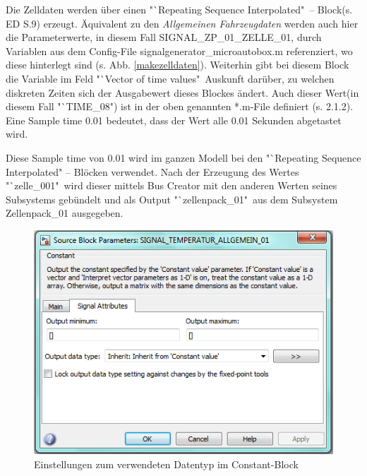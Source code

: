 \documentclass[fontsize = 12pt, paper = a4]{scrreprt}
\begin{document}
Die Zelldaten werden über einen "`Repeating Sequence Interpolated"\ -- Block(s. ED S.9) erzeugt. Äquivalent zu den \textit{Allgemeinen Fahrzeugdaten} werden auch hier die Parameterwerte, in diesem Fall SIGNAL\_ZP\_01\_ZELLE\_01, durch Variablen aus dem Config-File signalgenerator\_microautobox.m referenziert, wo diese hinterlegt sind (s. Abb. \ref{makezelldaten}). Weiterhin gibt bei diesem Block die Variable im Feld "`Vector of time values"\ Auskunft darüber, zu welchen diskreten Zeiten sich der Ausgabewert dieses Blockes ändert. Auch dieser Wert(in diesem Fall "`TIME\_08") ist in der oben genannten *.m-File  definiert (s. 2.1.2). Eine Sample time 0.01 bedeutet, dass der Wert alle 0.01 Sekunden abgetastet wird. 

\newpage

Diese Sample time von 0.01 wird im ganzen Modell bei den "`Repeating Sequence Interpolated" -- Blöcken verwendet. Nach der Erzeugung des Wertes "`zelle\_001"\ wird dieser mittels Bus Creator mit den anderen Werten seines Subsystems gebündelt und als Output "`zellenpack\_01"\ aus dem Subsystem Zellenpack\_01 ausgegeben.

\begin{figure}[h]
\centering
\includegraphics[scale = 0.8]{const_datentyp}
\caption[Enstellungen zum Datentyp im Constant-Block ]{Einstellungen zum verwendeten Datentyp im Constant-Block}
\label{constdatentyp}
\end{figure}
\end{document}
